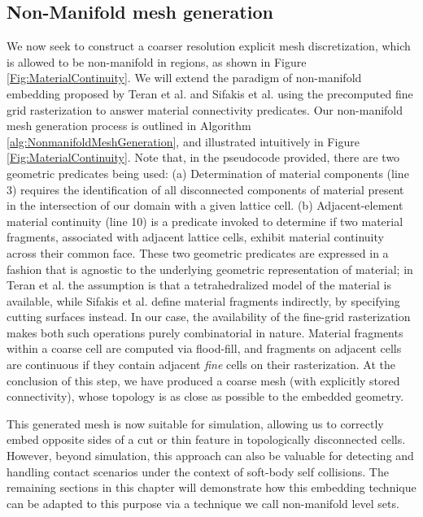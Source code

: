 \subsection{Non-Manifold mesh generation}
\label{sec:nonmanifoldmeshgeneration}

We now seek to construct a coarser resolution explicit mesh
discretization, which is allowed to be non-manifold in regions, as
shown in Figure \ref{Fig:MaterialContinuity}. We will extend the
paradigm of non-manifold embedding proposed by Teran et al.\!
 and Sifakis et al.\!
 using the precomputed fine grid rasterization
to answer material connectivity predicates. Our non-manifold mesh
generation process is outlined in Algorithm
\ref{alg:NonmanifoldMeshGeneration}, and illustrated intuitively in
Figure \ref{Fig:MaterialContinuity}. Note that, in the pseudocode
provided, there are two geometric predicates being used: (a)
Determination of material components (line 3) requires the
identification of all disconnected components of material present in
the intersection of our domain with a given lattice cell. (b)
Adjacent-element material continuity (line 10) is a predicate invoked
to determine if two material fragments, associated with adjacent
lattice cells, exhibit material continuity across their common
face. These two geometric predicates are expressed in a fashion that
is agnostic to the underlying geometric representation of material; in
Teran et al.\!  the assumption is that a
tetrahedralized model of the material is available, while Sifakis et
al.\!  define material fragments indirectly,
by specifying cutting surfaces instead. In our case, the availability
of the fine-grid rasterization makes both such operations purely
combinatorial in nature. Material fragments within a coarse cell are
computed via flood-fill, and fragments on adjacent cells are
continuous if they contain adjacent \emph{fine} cells on their
rasterization. At the conclusion of this step, we have produced a
coarse mesh (with explicitly stored connectivity), whose topology is
as close as possible to the embedded geometry.

This generated mesh is now suitable for simulation, allowing us to
correctly embed opposite sides of a cut or thin feature in
topologically disconnected cells. However, beyond simulation, this
approach can also be valuable for detecting and handling contact
scenarios under the context of soft-body self collisions. The
remaining sections in this chapter will demonstrate how this embedding
technique can be adapted to this purpose via a technique we call
non-manifold level sets.

